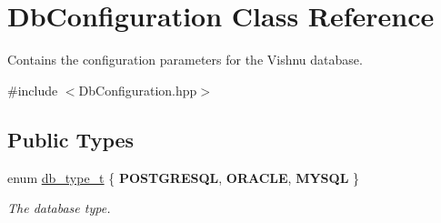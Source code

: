 \hypertarget{classDbConfiguration}{
\section{DbConfiguration Class Reference}
\label{classDbConfiguration}
}


Contains the configuration parameters for the Vishnu database.  




{\ttfamily \#include $<$DbConfiguration.hpp$>$}

\subsection*{Public Types}
\begin{DoxyCompactItemize}
\item 
enum \hyperlink{classDbConfiguration_a4a57e43a5017a5c4833a784a994c91cf}{db\_\-type\_\-t} \{ {\bfseries POSTGRESQL}, 
{\bfseries ORACLE}, 
{\bfseries MYSQL}
 \}
\begin{DoxyCompactList}\small\item\em The database type. \item\end{DoxyCompactList}\end{DoxyCompactItemize}
